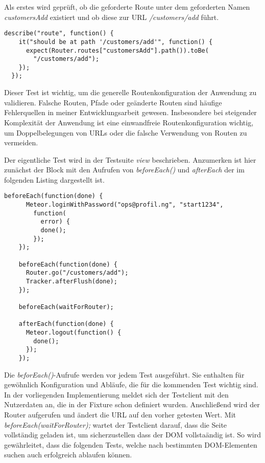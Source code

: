 

Als erstes wird geprüft, ob die geforderte Route unter dem geforderten Namen
\textit{customersAdd} existiert und ob diese zur URL \textit{/customers/add}
führt.

\begin{lstlisting}[caption=Test auf Existenz der Route 'customersAdd']
  describe("route", function() {
    it("should be at path '/customers/add'", function() {
      expect(Router.routes["customersAdd"].path()).toBe(
        "/customers/add");
    });
  });
\end{lstlisting}

Dieser Test ist wichtig, um die generelle Routenkonfiguration der Anwendung zu
validieren. Falsche Routen, Pfade oder geänderte Routen sind häufige
Fehlerquellen in meiner Entwicklungsarbeit gewesen. Insbesondere bei steigender
Komplexität der Anwendung ist eine einwandfreie Routenkonfiguration wichtig, um
Doppelbelegungen von URLs oder die falsche Verwendung von Routen zu vermeiden.

Der eigentliche Test wird in der Testsuite \textit{view} beschrieben. Anzumerken ist hier
zunächst der Block mit den Aufrufen von \textit{beforeEach()} und \textit{afterEach} der im
folgenden Listing dargestellt ist.

\begin{lstlisting}[caption=Vor- und Nachtestkonfiguration]
  beforeEach(function(done) {
      Meteor.loginWithPassword("ops@profil.ng", "start1234",
        function(
          error) {
          done();
        });
    });

    beforeEach(function(done) {
      Router.go("/customers/add");
      Tracker.afterFlush(done);
    });

    beforeEach(waitForRouter);

    afterEach(function(done) {
      Meteor.logout(function() {
        done();
      });
    });
\end{lstlisting}

Die \textit{beforEach()}-Aufrufe werden vor jedem Test ausgeführt. Sie enthalten
für gewöhnlich Konfiguration und Abläufe, die für die kommenden Test wichtig
sind. In der vorliegenden Implementierung meldet sich der Testclient mit den
Nutzerdaten an, die in der Fixture schon definiert wurden. Anschließend wird der
Router aufgerufen und ändert die URL auf den vorher getesten Wert. Mit
\textit{beforeEach(waitForRouter);} wartet der Testclient darauf, dass die Seite
vollständig geladen ist, um  sicherzustellen dass der DOM vollstaändig ist. So
wird gewährleitet, dass die folgenden Tests, welche nach bestimmten
DOM-Elementen suchen auch erfolgreich ablaufen können.

